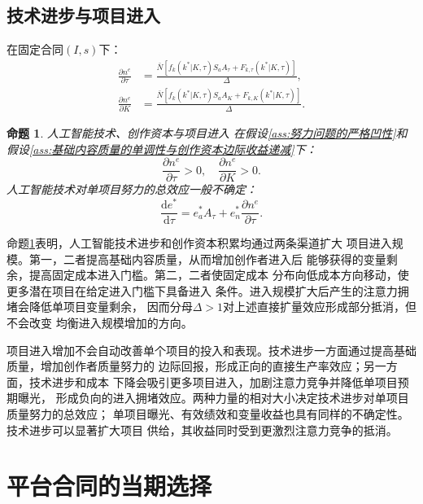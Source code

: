 \documentclass[UTF8, a4paper, 12pt, fontset=fandol]{ctexart}
\newtheorem{proposition}[theorem]{命题}
\theoremstyle{definition}
\theoremstyle{remark}
\begin{document}
\subsection{技术进步与项目进入}
在固定合同$(I,s)$下：
\begin{align*}
  \frac{\partial n^e}{\partial \tau} &= 
  \frac{\bar{N}[f_k(k^*|K,\tau)S_a A_\tau + F_{k,\tau}(k^*|K,\tau)]}{\Delta},\\
  \frac{\partial n^e}{\partial K} &= 
  \frac{\bar{N}[f_k(k^*|K,\tau)S_aA_K+F_{k,K}(k^*|K,\tau)]}{\Delta}.
\end{align*}
\begin{proposition}{人工智能技术、创作资本与项目进入}
  \label{prop:人工智能技术、创作资本与项目进入}
  在假设\ref{ass:努力问题的严格凹性}和假设\ref{ass:基础内容质量的单调性与创作资本边际收益递减}下：
  \begin{equation*}
    \frac{\partial n^e}{\partial \tau}>0,\quad 
    \frac{\partial n^e}{\partial K}>0.
  \end{equation*}
  人工智能技术对单项目努力的总效应一般不确定：
  \begin{equation*}
    \frac{\mathrm{d}e^*}{\mathrm{d}\tau} = 
    e_a^* A_\tau + e_n^* \frac{\partial n^e}{\partial \tau}.
  \end{equation*}
\end{proposition}
命题\ref{prop:人工智能技术、创作资本与项目进入}表明，人工智能技术进步和创作资本积累均通过两条渠道扩大
项目进入规模。第一，二者提高基础内容质量，从而增加创作者进入后
能够获得的变量剩余，提高固定成本进入门槛。第二，二者使固定成本
分布向低成本方向移动，使更多潜在项目在给定进入门槛下具备进入
条件。进入规模扩大后产生的注意力拥堵会降低单项目变量剩余，
因而分母$\Delta>1$对上述直接扩量效应形成部分抵消，但不会改变
均衡进入规模增加的方向。

项目进入增加不会自动改善单个项目的投入和表现。技术进步一方面通过提高基础质量，增加创作者质量努力的
边际回报，形成正向的直接生产率效应；另一方面，技术进步和成本
下降会吸引更多项目进入，加剧注意力竞争并降低单项目预期曝光，
形成负向的进入拥堵效应。两种力量的相对大小决定技术进步对单项目质量努力的总效应；
单项目曝光、有效绩效和变量收益也具有同样的不确定性。技术进步可以显著扩大项目
供给，其收益同时受到更激烈注意力竞争的抵消。
\section{平台合同的当期选择}
\end{document}

